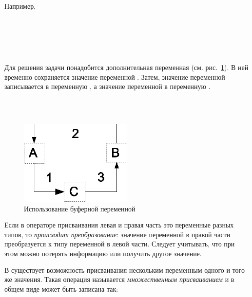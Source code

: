 Например,

\noindent
{}\\
\\
\\
\\



Для решения задачи понадобится дополнительная переменная  (см. рис.~\ref{ch02:refDrawing0}). 
В ней временно сохраняется значение переменной . Затем, значение переменной
 записывается в переменную , а значение переменной  в
переменную .

\noindent{}\\
\\


\begin{figure}[htb]
\begin{center}
\includegraphics[width=0.5\textwidth]{img/ris_2_1}
\caption{Использование буферной переменной}
\label{ch02:refDrawing0}
\end{center}
\end{figure}

Если в операторе присваивания левая и правая часть это переменные разных типов, то \emph{происходит
преобразование}: значение переменной в правой части преобразуется к типу переменной в левой части. Следует учитывать,
что при этом можно потерять информацию или получить другое значение.

В  существует возможность присваивания нескольким переменным одного и того же значения. Такая операция называется
\emph{множественным присваиванием} и в общем виде может быть
записана так:

